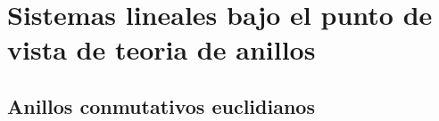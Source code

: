 
\chapter{Sistemas  lineales bajo el punto de vista de teoria de anillos}


    \section{Anillos conmutativos euclidianos}

